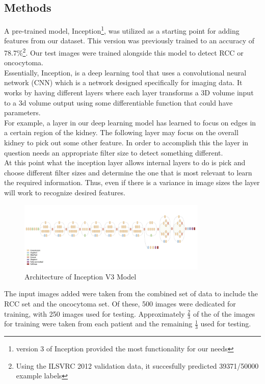 \documentclass[conference]{IEEEtran}
\begin{document}
\subsection{Methods}
A pre-trained model, Inception\footnote{version 3 of Inception provided the most functionality for our needs}\cite{b10}, was utilized as a starting point for adding features from our dataset. This version was previously trained to an accuracy of 78.7\%\footnote{Using the ILSVRC 2012 validation data, it succesfully predicted 39371/50000 example labels}. Our test images were trained alongside this model to detect RCC or oncocytoma.\\
Essentially, Inception, is a deep learning tool that uses a convolutional neural network (CNN) which is a network designed specifically for imaging data.  It works by having different layers where each layer transforms a 3D volume input to a 3d volume output using some differentiable function that could have parameters. \\ 
For example, a layer in our deep learning model has learned to focus on edges in a certain region of the kidney. The following layer may focus on the overall kidney to pick out some other feature.  In order to accomplish this the layer in question needs an appropriate filter size to detect something different.\\  
At this point what the inception layer allows internal layers to do is pick and choose different filter sizes and determine the one that is most relevant to learn the required information.  Thus, even if there is a variance in image sizes the layer will work to recognize desired features.

\begin{figure}[h]
\includegraphics[width=9cm]{inception_v3_architecture.png}
  \caption{Architecture of Inception V3 Model}
  \label{fig:Inception Model}
\end{figure}


The input images added were taken from the combined set of data to include the RCC set and the oncocytoma set. Of these, 500 images were dedicated for training, with 250 images used for testing. Approximately \(\frac{2}{3} \) of the of the images for training were taken from each patient and the remaining \(\frac{1}{3} \) used for testing.
\hfill \\
\end{document}
